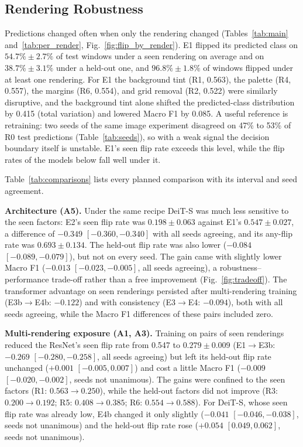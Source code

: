 \documentclass[10pt,journal,compsoc]{IEEEtran}
\newif\ifshowdraft
\newcommand{\draft}[1]{\ifshowdraft\textcolor{red}{[#1]}\fi}
\newcommand{\gen}[2]{\IfFileExists{generated/#1}{}{\draft{#2}}}
\begin{document}
\subsection{Rendering Robustness}
\gen{tables/table2_per_render.tex}{Table 2: per-rendering sensitivity, generated}
Predictions changed often when only the rendering changed (Tables~\ref{tab:main} and~\ref{tab:per_render}, Fig.~\ref{fig:flip_by_render}). E1 flipped its predicted class on $54.7\% \pm 2.7\%$ of test windows under a seen rendering on average and on $38.7\% \pm 3.1\%$ under a held-out one, and $96.8\% \pm 1.8\%$ of windows flipped under at least one rendering. For E1 the background tint (R1, 0.563), the palette (R4, 0.557), the margins (R6, 0.554), and grid removal (R2, 0.522) were similarly disruptive, and the background tint alone shifted the predicted-class distribution by 0.415 (total variation) and lowered Macro F1 by 0.085. A useful reference is retraining: two seeds of the same image experiment disagreed on 47\% to 53\% of R0 test predictions (Table~\ref{tab:seeds}), so with a weak signal the decision boundary itself is unstable. E1's seen flip rate exceeds this level, while the flip rates of the models below fall well under it.

Table~\ref{tab:comparisons} lists every planned comparison with its interval and seed agreement.

\textbf{Architecture (A5).} Under the same recipe DeiT-S was much less sensitive to the seen factors: E2's seen flip rate was $0.198 \pm 0.063$ against E1's $0.547 \pm 0.027$, a difference of $-0.349$ $[-0.360, -0.340]$ with all seeds agreeing, and its any-flip rate was $0.693 \pm 0.134$. The held-out flip rate was also lower ($-0.084$ $[-0.089, -0.079]$), but not on every seed. The gain came with slightly lower Macro F1 ($-0.013$ $[-0.023, -0.005]$, all seeds agreeing), a robustness--performance trade-off rather than a free improvement (Fig.~\ref{fig:tradeoff}). The transformer advantage on seen renderings persisted after multi-rendering training (E3b$\to$E4b: $-0.122$) and with consistency (E3$\to$E4: $-0.094$), both with all seeds agreeing, while the Macro F1 differences of these pairs included zero.

\textbf{Multi-rendering exposure (A1, A3).} Training on pairs of seen renderings reduced the ResNet's seen flip rate from 0.547 to $0.279 \pm 0.009$ (E1$\to$E3b: $-0.269$ $[-0.280, -0.258]$, all seeds agreeing) but left its held-out flip rate unchanged ($+0.001$ $[-0.005, 0.007]$) and cost a little Macro F1 ($-0.009$ $[-0.020, -0.002]$, seeds not unanimous). The gains were confined to the seen factors (R1: $0.563 \to 0.250$), while the held-out factors did not improve (R3: $0.200 \to 0.192$; R5: $0.408 \to 0.385$; R6: $0.554 \to 0.588$). For DeiT-S, whose seen flip rate was already low, E4b changed it only slightly ($-0.041$ $[-0.046, -0.038]$, seeds not unanimous) and the held-out flip rate rose ($+0.054$ $[0.049, 0.062]$, seeds not unanimous).
\end{document}
